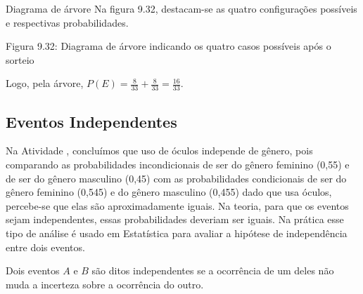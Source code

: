 \begin{example} {Diagrama de árvore}
Na figura 9.32, destacam-se as quatro configurações possíveis e respectivas probabilidades.
\begin{center}\end{center}
Figura 9.32: Diagrama de árvore indicando os quatro casos possíveis após o sorteio

Logo, pela árvore, \(P(E)=\frac{8}{33}+\frac{8}{33}=\frac{16}{33}\).
\end{example}


\subsection{Eventos Independentes}
\label{\detokenize{PE511-7:id3}}\label{\detokenize{PE511-7:eventos-independentes}}
Na Atividade , concluímos que uso de óculos independe de gênero, pois  comparando as probabilidades incondicionais de ser do gênero feminino (0,55) e de ser do gênero masculino (0,45) com as probabilidades condicionais de ser do gênero feminino (0,545) e do gênero masculino (0,455) dado que usa óculos, percebe-se que elas são aproximadamente iguais. Na teoria, para que os eventos sejam independentes, essas probabilidades deveriam ser iguais. Na prática esse tipo de análise é usado em Estatística para avaliar a hipótese de independência entre dois eventos.
\begin{description}
\item[{Dois eventos \(A\) e \(B\) são ditos independentes se a ocorrência de um deles não muda a incerteza sobre a ocorrência do outro.}] \leavevmode{}\label{\detokenize{PE511-7:term-dois-eventos-e-sao-ditos-independentes-se-a-ocorrencia-de-um-deles-nao-muda-a-incerteza-sobre-a-ocorrencia-do-outro}}
\end{description}

